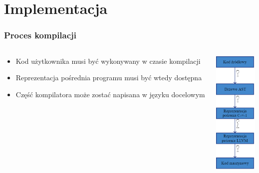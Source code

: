 \section{Implementacja}

\begin{frame}
	\frametitle{Proces kompilacji}

	\begin{columns}
		\begin{column}{0.5\textwidth}
			\begin{itemize}
				\item Kod użytkownika musi być wykonywany w czasie kompilacji
				\item Reprezentacja pośrednia programu musi być wtedy dostępna
				\item Część kompilatora może zostać napisana w języku docelowym
			\end{itemize}
		\end{column}
		\begin{column}{0.5\textwidth}  %
			\begin{center}
			 \includegraphics[height=6cm]{../assets/toplevelcompilationprocess.png}
			 \end{center}
		\end{column}
	\end{columns}
\end{frame}
